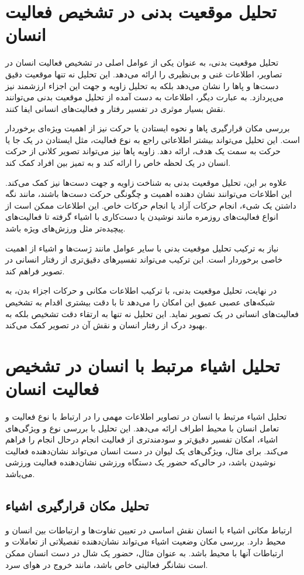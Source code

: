 \section{تحلیل موقعیت بدنی در تشخیص فعالیت انسان} 

تحلیل موقعیت بدنی، به عنوان یکی از عوامل اصلی در تشخیص فعالیت انسان در تصاویر، اطلاعات غنی و بی‌نظیری را ارائه می‌دهد. این تحلیل نه تنها موقعیت دقیق دست‌ها و پاها را نشان می‌دهد بلکه به تحلیل زاویه و جهت این اجزاء ارزشمند نیز می‌پردازد. به عبارت دیگر، اطلاعات به دست آمده از تحلیل موقعیت بدنی می‌توانند نقش بسیار موثری در تفسیر رفتار و فعالیت‌های انسانی ایفا کنند.

بررسی مکان قرارگیری پاها و نحوه ایستادن یا حرکت نیز از اهمیت ویژه‌ای برخوردار است. این تحلیل می‌تواند بیشتر اطلاعاتی راجع به نوع فعالیت، مثل ایستادن در یک جا یا حرکت به سمت یک هدف، ارائه دهد. زاویه پاها نیز می‌تواند تصویر کلانی از حرکت انسان در یک لحظه خاص را ارائه کند و به تمیز بین افراد کمک کند.

علاوه بر این، تحلیل موقعیت بدنی به شناخت زاویه و جهت دست‌ها نیز کمک می‌کند. این اطلاعات می‌توانند نشان دهنده اهمیت و چگونگی حرکت دست‌ها باشند، مانند نگه داشتن یک شیء، انجام حرکات آزاد یا انجام حرکات خاص. این اطلاعات ممکن است از انواع فعالیت‌های روزمره مانند نوشیدن یا دست‌کاری با اشیاء گرفته تا فعالیت‌های پیچیده‌تر مثل ورزش‌های ویژه باشد.

نیاز به ترکیب تحلیل موقعیت بدنی با سایر عوامل مانند ژست‌ها و اشیاء از اهمیت خاصی برخوردار است. این ترکیب می‌تواند تفسیرهای دقیق‌تری از رفتار انسانی در تصویر فراهم کند.

در نهایت، تحلیل موقعیت بدنی، با ترکیب اطلاعات مکانی و حرکات اجزاء بدن، به شبکه‌های عصبی عمیق این امکان را می‌دهد تا با دقت بیشتری اقدام به تشخیص فعالیت‌های انسانی در یک تصویر نماید. این تحلیل نه تنها به ارتقاء دقت تشخیص بلکه به بهبود درک از رفتار انسان و نقش آن در تصویر کمک می‌کند.
\section{تحلیل اشیاء مرتبط با انسان در تشخیص فعالیت انسان}
تحلیل اشیاء مرتبط با انسان در تصاویر اطلاعات مهمی را در ارتباط با نوع فعالیت و تعامل انسان با محیط اطراف ارائه می‌دهد. این تحلیل با بررسی نوع و ویژگی‌های اشیاء، امکان تفسیر دقیق‌تر و سودمندتری از فعالیت انجام درحال انجام‌ را فراهم می‌کند. برای مثال، ویژگی‌های یک لیوان در دست انسان می‌تواند نشان‌دهنده فعالیت نوشیدن باشد، در حالی‌که حضور یک دستگاه ورزشی نشان‌دهنده فعالیت ورزشی می‌باشد.
\subsection{تحلیل مکان قرارگیری اشیاء}
ارتباط مکانی اشیاء با انسان نقش اساسی در تعیین تفاوت‌ها و ارتباطات بین انسان و محیط دارد. بررسی مکان وضعیت اشیاء می‌تواند نشان‌دهنده تفصیلاتی از تعاملات و ارتباطات آنها با محیط باشد. به عنوان مثال، حضور یک شال در دست انسان ممکن است نشانگر فعالیتی خاص باشد، مانند خروج در هوای سرد.
